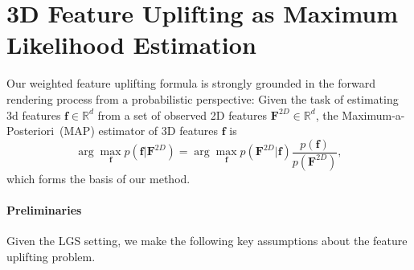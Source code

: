 \clearpage
\setcounter{page}{1}
\maketitlesupplementary

\section{3D Feature Uplifting as Maximum Likelihood Estimation}
Our weighted feature uplifting formula is strongly grounded in the forward rendering process from a probabilistic perspective: Given the task of estimating 3d features $\mathbf{f} \in \mathbb{R}^d$ from a set of observed 2D features $\mathbf{F}^{2D} \in \mathbb{R}^d$, the Maximum-a-Posteriori~(MAP) estimator of 3D features $\mathbf{f}$ is
\begin{equation}
    \arg\max_\mathbf{f} p(\mathbf{f}|\mathbf{F}^{2D}) = \arg\max_\mathbf{f} p(\mathbf{F}^{2D}|\mathbf{f})\frac{p(\mathbf{f})}{p(\mathbf{F}^{2D})},
    \label{eq:map}
\end{equation}
which forms the basis of our method.

\paragraph{Preliminaries}

Given the LGS setting, we make the following key assumptions about the feature uplifting problem.

